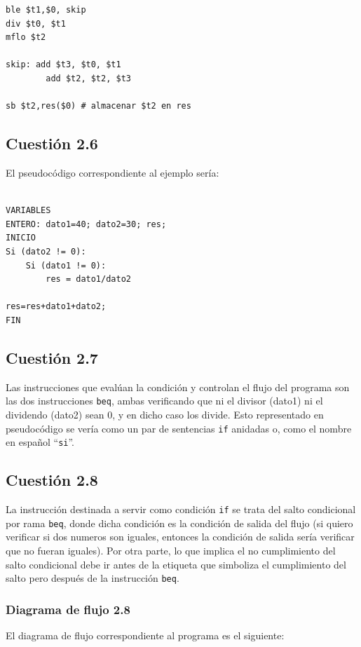 \documentclass[11pt]{article}
\begin{document}
\begin{large}
\begin{flushleft}
\begin{listing}[h]
\begin{verbatim}
ble $t1,$0, skip
div $t0, $t1
mflo $t2

skip: add $t3, $t0, $t1
        add $t2, $t2, $t3

sb $t2,res($0) # almacenar $t2 en res

\end{verbatim}
\end{listing}


\subsection*{Cuestión 2.6}
El pseudocódigo correspondiente al ejemplo sería:

\begin{listing}[h]
\begin{verbatim}

VARIABLES
ENTERO: dato1=40; dato2=30; res;
INICIO
Si (dato2 != 0):
    Si (dato1 != 0):
        res = dato1/dato2

res=res+dato1+dato2;
FIN

\end{verbatim}
\end{listing}


\subsection*{Cuestión 2.7}
Las instrucciones que evalúan la condición y controlan el flujo del programa son las dos instrucciones \texttt{beq}, ambas verificando que ni el divisor (dato1) ni el dividendo (dato2) sean 0, y en dicho caso los divide. Esto representado en pseudocódigo se vería como un par de sentencias \texttt{if} anidadas o, como el nombre en español ``\texttt{si}''.

\subsection*{Cuestión 2.8}
La instrucción destinada a servir como condición \texttt{if} se trata del salto condicional por rama \texttt{beq}, donde dicha condición es la condición de salida del flujo (si quiero verificar si dos numeros son iguales, entonces la condición de salida sería verificar que no fueran iguales). Por otra parte, lo que implica el no cumplimiento del salto condicional debe ir antes de la etiqueta que simboliza el cumplimiento del salto pero después de la instrucción \texttt{beq}.

\subsubsection*{Diagrama de flujo 2.8}
El diagrama de flujo correspondiente al programa es el siguiente:


\end{flushleft}
\end{large}
\end{document}
